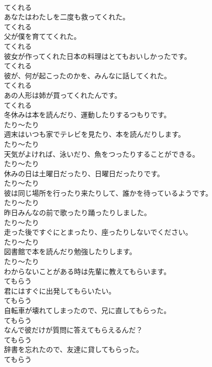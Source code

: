 \documentclass[8pt]{extreport}
\begin{document}
\begin{CJK}{UTF8}{min}
\\	てくれる
\\	あなたはわたしを二度も救ってくれた。	
\\	てくれる
\\	父が僕を育ててくれた。	
\\	てくれる
\\	彼女が作ってくれた日本の料理はとてもおいしかったです。	
\\	てくれる
\\	彼が、何が起こったのかを、みんなに話してくれた。	
\\	てくれる
\\	あの人形は姉が買ってくれたんです。	
\\	てくれる
\\	冬休みは本を読んだり、運動したりするつもりです。	
\\	たり～たり
\\	週末はいつも家でテレビを見たり、本を読んだりします。	
\\	たり～たり
\\	天気がよければ、泳いだり、魚をつったりすることができる。	
\\	たり～たり
\\	休みの日は土曜日だったり、日曜日だったりです。	
\\	たり～たり
\\	彼は同じ場所を行ったり来たりして、誰かを待っているようです。	
\\	たり～たり
\\	昨日みんなの前で歌ったり踊ったりしました。	
\\	たり～たり
\\	走った後ですぐにとまったり、座ったりしないでください。	
\\	たり～たり
\\	図書館で本を読んだり勉強したりします。	
\\	たり～たり
\\	わからないことがある時は先輩に教えてもらいます。	
\\	てもらう
\\	君にはすぐに出発してもらいたい。	
\\	てもらう
\\	自転車が壊れてしまったので、兄に直してもらった。	
\\	てもらう
\\	なんで彼だけが質問に答えてもらえるんだ？	
\\	てもらう
\\	辞書を忘れたので、友達に貸してもらった。	
\\	てもらう

\end{CJK}
\end{document}
